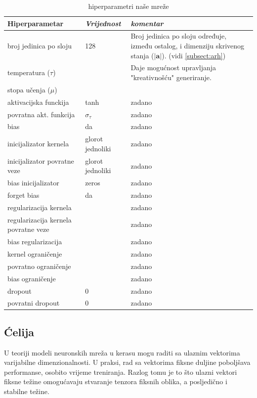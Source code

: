 \documentclass[conference]{IEEEtran}
\begin{document}
\begin{table}[htbp]
\caption{hiperparametri naše mreže}
\begin{center}
\begin{tabular}{|p{120pt}|p{40pt}|p{60pt}|}
\hline
\textbf{Hiperparametar} & \textbf{\textit{Vrijednost}} & \textbf{\textit{komentar}}\\ \hline
broj jedinica po sloju & 128 & Broj jedinica po sloju određuje, između ostalog, i dimenziju skrivenog stanja ($\lvert \mathbf{a} \rvert$). (vidi \ref{subsect:arh})\\ \hline
temperatura ($\tau$) &  & Daje mogućnost upravljanja "kreativnošću" generiranje. \\ \hline
stopa učenja ($\mu$) &  & \\ \hline \hline
aktivacijska funckija & tanh & zadano \\ \hline
povratna akt. funkcija & $\sigma_{\tau}$ & zadano \\ \hline
bias & da & zadano \\ \hline
inicijalizator kernela & glorot jednoliki & zadano \\ \hline
inicijalizator povratne veze & glorot jednoliki & zadano \\ \hline
bias inicijalizator & zeros & zadano \\ \hline
forget bias & da & zadano \\ \hline
regularizacija kernela & & zadano \\ \hline
regularizacija kernela povratne veze &  & zadano \\ \hline
bias regularizacija &  & zadano \\ \hline
kernel ograničenje &  & zadano \\ \hline
povratno ograničenje &  & zadano \\ \hline
bias ograničenje & & zadano\\ \hline
dropout & 0 & zadano \\ \hline
povratni dropout & 0 & zadano \\ \hline
\end{tabular}
\label{tab:hiper}
\end{center}
\end{table}


\subsection{Ćelija}
U teoriji modeli neuronskih mreža u kerasu mogu raditi sa ulaznim vektorima varijabilne dimenzionalnosti. U praksi, rad sa vektorima fiksne duljine poboljšava performanse, osobito vrijeme treniranja. Razlog tomu je to što ulazni vektori fiksne težine omogućavaju stvaranje tenzora fiksnih oblika, a posljedično i stabilne težine.
\end{document}
